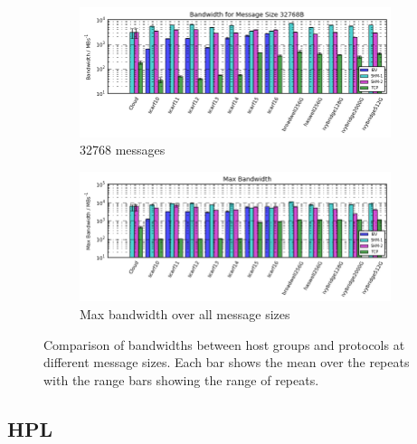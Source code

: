 \documentclass{article}
\begin{document}
             \begin{figure}[H]\ContinuedFloat
                \centering
                \begin{subfigure}{\textwidth}
                  \centering
                    \includegraphics[width=\textwidth]{compare_bandwidth-hostgroup_32768}
                  \caption{32768\si{\byte} messages}
                \end{subfigure}

                \begin{subfigure}{\textwidth}
                  \centering
                    \includegraphics[width=\textwidth]{compare_bandwidth-hostgroup_max}

                  \caption{Max bandwidth over all message sizes}
                \end{subfigure}
                \caption{Comparison of bandwidths between host groups and protocols at different message sizes. Each bar shows the mean over the repeats with the range bars showing the range of repeats.}
                \label{fig:compare_bandwidth-hostgroup_max}
             \end{figure}












    \subsection{HPL}
\end{document}
